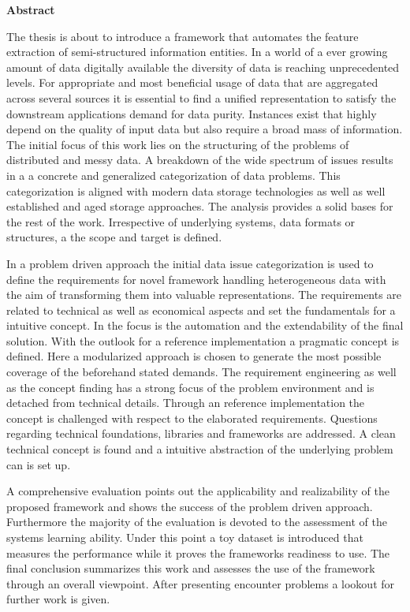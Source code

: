\thispagestyle{empty}
\vspace*{1.0cm}

\begin{center}
    \textbf{Abstract}
\end{center}

\vspace*{0.5cm}

\noindent
The thesis is about to introduce a framework that automates the feature extraction of semi-structured information entities. In a world of a ever growing amount of data digitally available the diversity of data is reaching unprecedented levels. For appropriate and most beneficial usage of data that are aggregated across several sources it is essential to find a unified representation to satisfy the downstream applications demand for data purity. Instances exist that highly depend on the quality of input data but also require a broad mass of information. The initial focus of this work lies on the structuring of the problems of distributed and messy data. A breakdown of the wide spectrum of issues results in a a concrete and generalized categorization of data problems.  This categorization is aligned with modern data storage technologies as well as well established and aged storage approaches. The analysis provides a solid bases for the rest of the work. Irrespective of underlying systems, data formats or structures, a the scope and target is defined. 

In a problem driven approach the initial data issue categorization is used to define the requirements for novel framework handling heterogeneous data with the aim of transforming them into valuable representations. The requirements are related to technical as well as economical aspects and set the fundamentals for a intuitive concept. In the focus is the automation and the extendability of the final solution. With the outlook for a reference implementation a pragmatic concept is defined. Here a modularized approach is chosen to generate the most possible coverage of the beforehand stated demands. The requirement engineering as well as the concept finding has a strong focus of the problem environment and is detached from technical details. Through an reference implementation the concept is challenged with respect to the elaborated requirements. Questions regarding technical foundations, libraries and frameworks are addressed. A clean technical concept is found and a intuitive abstraction of the underlying problem can is set up. 

A comprehensive evaluation points out the applicability and realizability of the proposed framework and shows the success of the problem driven approach. Furthermore the majority of the evaluation is devoted to the assessment of the systems learning ability. Under this point a toy dataset is introduced that measures the performance while it proves the frameworks readiness to use. The final conclusion summarizes this work and assesses the use of the framework through an overall viewpoint. After presenting encounter problems a lookout for further work is given.